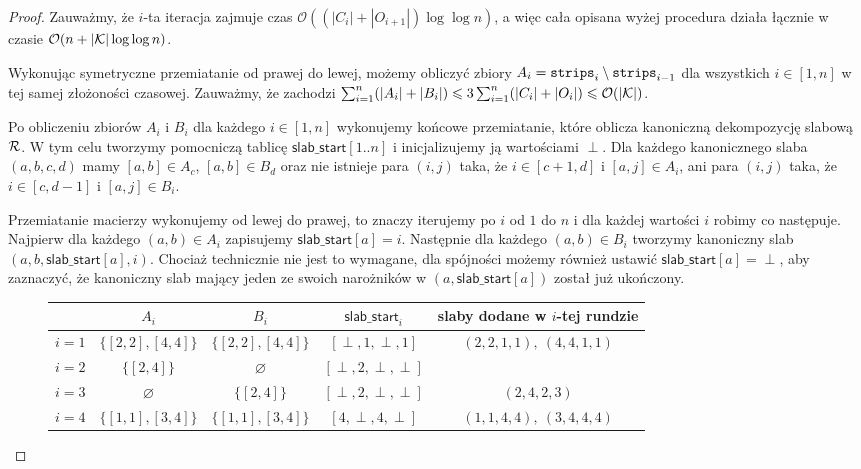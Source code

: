 \documentclass[runningheads]{llncs}
\newcommand{\Oh}{\mathcal{O}}
\renewcommand{\leq}{\leqslant}
\begin{document}
\begin{proof}
	Zauważmy, że $i$-ta iteracja zajmuje czas $\Oh((|C_i|+|O_{i+1}|)\log \log n)$, a więc cała opisana wyżej procedura działa łącznie w czasie $\Oh(n+|{\cal K}|\log \log n)$.
	
	Wykonując symetryczne przemiatanie od prawej do lewej, możemy obliczyć zbiory $A_i=\mathtt{strips}_i\setminus \mathtt{strips}_{i-1}$ dla wszystkich $i\in [1,n]$ w tej samej złożoności czasowej. Zauważmy, że zachodzi $\sum_{i=1}^n (|A_i|+|B_i|)\leq 3\sum_{i=1}^n (|C_i|+|O_i|)\leq \Oh(|\cal K|)$.
	
	Po obliczeniu zbiorów $A_i$ i $B_i$ dla każdego $i\in [1,n]$ wykonujemy końcowe przemiatanie, które oblicza kanoniczną dekompozycję slabową $\cal R$. W tym celu tworzymy pomocniczą tablicę $\mathsf{slab\_start}[1..n]$ i inicjalizujemy ją wartościami $\perp$. Dla każdego kanonicznego slaba $(a, b, c, d)$ mamy $[a, b] \in A_c$, $[a, b] \in B_d$ oraz nie istnieje para $(i, j)$ taka, że $i \in [c+1, d]$ i $[a, j] \in A_i$, ani para $(i, j)$ taka, że $i \in [c, d-1]$ i $[a, j] \in B_i$.
	
	Przemiatanie macierzy wykonujemy od lewej do prawej, to znaczy iterujemy po $i$ od $1$ do $n$ i dla każdej wartości $i$ robimy co następuje.
	Najpierw dla każdego $(a, b) \in A_i$ zapisujemy $\mathsf{slab\_start}[a] = i$. Następnie dla każdego $(a, b) \in B_i$ tworzymy kanoniczny slab $(a, b, \mathsf{slab\_start}[a], i)$. Chociaż technicznie nie jest to wymagane, dla spójności możemy również ustawić $\mathsf{slab\_start}[a] = \perp$, aby zaznaczyć, że kanoniczny slab mający jeden ze swoich narożników w $(a, \mathsf{slab\_start}[a])$ został już ukończony.
	
	
	

	\begin{figure}[h]
		\centering
			\begin{tabular}{|c|c|c|c|c|}
			\hline
			& $A_i$ & $B_i$ & $\mathsf{slab\_start}_i$ & slaby dodane w $i$-tej rundzie \\
			\hline
			$i=1$ & $\{[2,2], [4,4]\}$  & $\{[2,2], [4,4]\}$ & $[\perp, 1, \perp, 1]$ & $(2,2,1,1),\ (4,4,1,1)$\\
			\hline
			$i=2$ & $\{[2,4]\}$ &  $\varnothing$ & $[\perp, 2, \perp, \perp]$ & \\
			\hline
			$i=3$ & $\varnothing$ & $\{[2,4]\}$ & $[\perp, 2, \perp, \perp]$ & $(2,4, 2,3)$\\
			\hline
			$i=4$ & $\{[1,1], [3,4]\}$ & $\{[1,1], [3,4]\}$ & $[4, \perp, 4, \perp]$ & $(1,1,4,4),\ (3,4, 4,4)$\\
			\hline
		\end{tabular}
	

\end{figure}
\end{proof}
\end{document}
